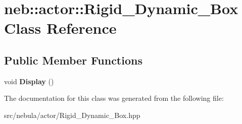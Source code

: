 \hypertarget{classneb_1_1actor_1_1Rigid__Dynamic__Box}{\section{neb\-:\-:actor\-:\-:\-Rigid\-\_\-\-Dynamic\-\_\-\-Box \-Class \-Reference}
\label{classneb_1_1actor_1_1Rigid__Dynamic__Box}
}
\subsection*{\-Public \-Member \-Functions}
\begin{DoxyCompactItemize}
\item 
\hypertarget{classneb_1_1actor_1_1Rigid__Dynamic__Box_ad2564e54df3b07cc2454ba28a026b765}{void {\bfseries \-Display} ()}\label{classneb_1_1actor_1_1Rigid__Dynamic__Box_ad2564e54df3b07cc2454ba28a026b765}

\end{DoxyCompactItemize}


\-The documentation for this class was generated from the following file\-:\begin{DoxyCompactItemize}
\item 
src/nebula/actor/\-Rigid\-\_\-\-Dynamic\-\_\-\-Box.\-hpp\end{DoxyCompactItemize}
